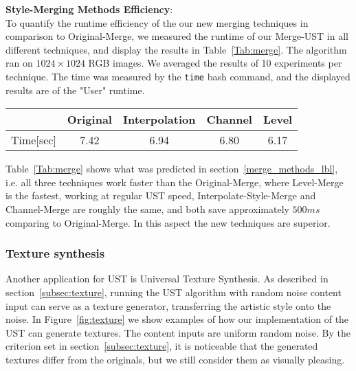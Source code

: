 \textbf{Style-Merging Methods Efficiency}:\\
To quantify the runtime efficiency of the our new merging techniques in comparison to Original-Merge, we measured the runtime of our Merge-UST in all different techniques, and display the results in Table~\ref{Tab:merge}. The algorithm ran on $1024\times 1024$ RGB images. We averaged the results of 10 experiments per technique. The time was measured by the \texttt{time} bash command, and the displayed results are of the "User" runtime.
\begin{center}
	\begin{tabular}{||c| |c| |c| |c| |c||} 
		\hline
		\space & Original & Interpolation & Channel & Level \\ [0.5ex] 
		\hline\hline
		Time[sec] & 7.42 & 6.94 & 6.80 & 6.17\\ 
		\hline
	\end{tabular}
\end{center}

Table~\ref{Tab:merge} shows what was predicted in section~\ref{merge_methods_lbl}, i.e. all three techniques work faster than the Original-Merge, where Level-Merge is the fastest, working at regular UST speed, Interpolate-Style-Merge and Channel-Merge are roughly the same, and both save approximately $500ms$ comparing to Original-Merge. In this aspect the new techniques are superior.

\subsubsection{Texture synthesis}
Another application for UST is Universal Texture Synthesis. As described in section~\ref{subsec:texture}, running the UST algorithm with random noise content input can serve as a texture generator, transferring the artistic style onto the noise. In Figure~\ref{fig:texture} we show examples of how our implementation of the UST can generate textures. The content inputs are uniform random noise. By the criterion set in section~\ref{subsec:texture}, it is noticeable that the generated textures differ from the originals, but we still consider them as visually pleasing.

